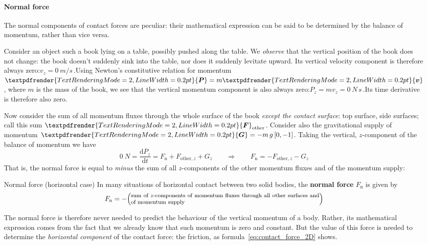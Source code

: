 \documentclass[a4paper,12pt,%
onecolumn,oneside,%
british%
]{memoir}
\renewcommand*{\bm}[1]{\textpdfrender{TextRenderingMode=2,LineWidth=0.2pt}{\boldsymbol{#1}}}
\newcommand*{\di}{\mathrm{d}}%
\renewcommand*{\|}[1][]{\nonscript\:#1\vert\nonscript\:\mathopen{}}
\newcommand*{\yv}{\bm{v}}
\newcommand*{\dt}{\di t}
\newcommand*{\ym}{m}%
\newcommand*{\yP}{\bm{P}}
\newcommand*{\yF}{\bm{F}}
\newcommand*{\yFn}{F_{\textrm{n}}}
\newcommand*{\yFr}{\yF_{\textrm{other}}}
\newcommand*{\yFrz}{F_{\textrm{other},z}}
\newcommand*{\yG}{\bm{G}}
\begin{document}
\paragraph{Normal force}
\label{sec:normal_force}

The normal components of contact forces are peculiar: their mathematical expression can be said to be determined by the balance of momentum, rather than vice versa.

Consider an object such a book lying on a table, possibly pushed along the table. We \emph{observe} that the vertical position of the book does not change: the book doesn't suddenly sink into the table, nor does it suddenly levitate upward. Its vertical velocity component is therefore always zero:\enskip$v_{z} = \qty{0}{m/s}$\,.\enskip Using Newton's constitutive relation for momentum $\yP=\ym\yv$, where $\ym$ is the mass of the book, we see that the vertical momentum component is also always zero:\enskip$P_{z}=\ym v_{z} = \qty{0}{N\,s}$\,.\enskip Its time derivative is therefore also zero.

Now consider the sum of all momentum fluxes through the whole surface of the book \emph{except the contact surface}: top surface, side surfaces; call this sum $\yFr$. Consider also the gravitational supply of momentum $\yG=-\ym\,g\,[0,-1]$. Taking the vertical, $z$-component of the balance of momentum we have
\begin{equation*}
  \qty{0}{N} =
  \frac{\di P_{z}}{\dt}
  = \yFn + \yFrz + G_{z}
\qquad  \Longrightarrow\qquad
  \yFn = - \yFrz - G_{z}
\end{equation*}
That is, the normal force is equal to \emph{minus} the sum of all $z$-components of the other momentum fluxes and of the momentum supply:
\begin{definition}{Normal force (horizontal case)}\label{def:normalforce}
  In many situations of horizontal contact between two solid bodies, the \textbf{normal force} $\yFn$ is given by
  \begin{equation*}
    \yFn = -\Bigl(\parbox{0.8\linewidth}{\footnotesize sum of $z$-components of momentum fluxes through all other surfaces and of momentum supply}\Bigr)
  \end{equation*}
\end{definition}

The normal force is therefore never needed to predict the behaviour of the vertical momentum of a body. Rather, its mathematical expression comes from the fact that we already know that such momentum is zero and constant. But the value of this force is needed to determine the \emph{horizontal component} of the contact force: the friction, as formula~\eqref{eq:contact_force_2D} shows.
\end{document}
